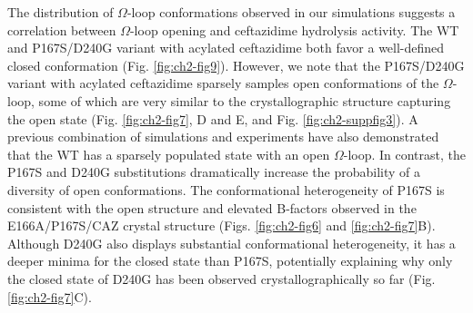 \documentclass[../main.tex]{subfiles}
\begin{document}
        The distribution of $\Omega$-loop conformations observed in our simulations suggests a correlation between $\Omega$-loop opening and ceftazidime hydrolysis activity. The WT and P167S/D240G variant with acylated ceftazidime both favor a well-defined closed conformation (Fig. \ref{fig:ch2-fig9}). However, we note that the P167S/D240G variant with acylated ceftazidime sparsely samples open conformations of the $\Omega$-loop, some of which are very similar to the crystallographic structure capturing the open state (Fig. \ref{fig:ch2-fig7}, D and E, and Fig. \ref{fig:ch2-suppfig3}). A previous combination of simulations and experiments have also demonstrated that the WT has a sparsely populated state with an open $\Omega$-loop\cite{Porter:2019hv}. In contrast, the P167S and D240G substitutions dramatically increase the probability of a diversity of open conformations. The conformational heterogeneity of P167S is consistent with the open structure and elevated B-factors observed in the E166A/P167S/CAZ crystal structure (Figs. \ref{fig:ch2-fig6} and \ref{fig:ch2-fig7}B). Although D240G also displays substantial conformational heterogeneity, it has a deeper minima for the closed state than P167S, potentially explaining why only the closed state of D240G has been observed crystallographically so far (Fig. \ref{fig:ch2-fig7}C).
\end{document}

